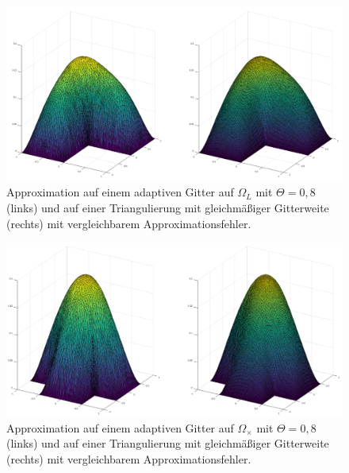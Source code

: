 \begin{figure}[!htbp]
	\begin{center}
		\includegraphics[width=15cm]{pics/approx.PNG}
	\end{center}
	\caption{\label{app} Approximation auf einem adaptiven Gitter auf $\Omega_L$ mit $\Theta = 0,8$ (links) und auf einer Triangulierung mit gleichmäßiger Gitterweite (rechts) mit vergleichbarem Approximationsfehler.}
\end{figure}
\begin{figure}[!htbp]
	\begin{center}
		\includegraphics[width=15cm]{pics/approx2.PNG}
	\end{center}
	\caption{\label{app2} Approximation auf einem adaptiven Gitter auf $\Omega_\times$ mit $\Theta = 0,8$ (links) und auf einer Triangulierung mit gleichmäßiger Gitterweite (rechts) mit vergleichbarem Approximationsfehler.}
\end{figure}
